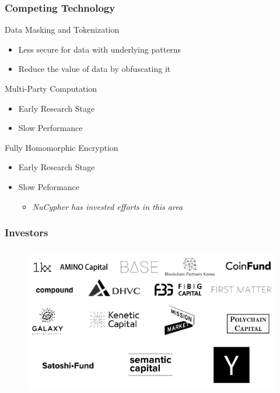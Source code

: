 \documentclass[xetex,mathsans,sans,aspectratio=169]{beamer}
\begin{document}
    \begin{frame}
      \frametitle{Competing Technology}
       Data Masking and Tokenization
       \begin{itemize}
           \item Less secure for data with underlying patterns
           \item Reduce the value of data by obfuscating it
       \end{itemize}

       Multi-Party Computation
       \begin{itemize}
           \item Early Research Stage
           \item Slow Performance
       \end{itemize}
      
       Fully Homomorphic Encryption
       \begin{itemize}
           \item Early Research Stage
           \item Slow Peformance
           \begin{itemize}
               \item \emph{NuCypher has invested efforts in this area}
           \end{itemize}
       \end{itemize}
       
     \end{frame}
    
    \begin{frame}
      \frametitle{Investors}
        \begin{figure}
            \centering
            \includegraphics[height=6.5cm]{pdf/investors.pdf}
        \end{figure}
    \end{frame}
\end{document}
